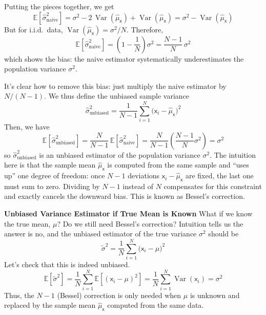Putting the pieces together, we get
\begin{equation}
    \mathbb{E}\!\left[\hat{\sigma}^{2}_{\text{naive}}\right] 
    = \sigma^2 - 2\,\operatorname{Var}(\hat{\mu}_{\mathsf{x}}) + \operatorname{Var}(\hat{\mu}_{\mathsf{x}})
    =\sigma^{2}-\operatorname{Var}(\hat{\mu}_{\mathsf{x}})
\end{equation}
But for i.i.d.\ data, $\operatorname{Var}(\hat{\mu}_{\mathsf{x}})=\sigma^{2}/N$. Therefore,
\begin{equation}
    \mathbb{E}\!\left[\hat{\sigma}^{2}_{\text{naive}}\right]
    =\left(1-\frac{1}{N}\right)\sigma^{2}
    =\frac{N-1}{N}\,\sigma^{2}
\end{equation}
which shows the bias: the naive estimator systematically underestimates the population variance $\sigma^2$.

It's clear how to remove this bias: just multiply the naive estimator by $N/(N-1)$. We thus define the unbiased sample variance
\begin{equation}
    \hat{\sigma}^{2}_{\text{unbiased}} = \frac{1}{N-1}\sum_{i=1}^{N}\bigl(\mathsf{x}_i-\hat{\mu}_{\mathsf{x}}\bigr)^{2}
\end{equation}
Then, we have
\begin{equation}
    \mathbb{E}[\hat{\sigma}^{2}_{\text{unbiased}}]
    =\frac{N}{N-1}\,\mathbb{E}\!\left[\hat{\sigma}^{2}_{\text{naive}}\right]
    =\frac{N}{N-1}\left(\frac{N-1}{N}\sigma^{2}\right)
    =\sigma^{2}
\end{equation}
so $\hat{\sigma}^{2}_{\text{unbiased}}$ is an unbiased estimator of the population variance $\sigma^{2}$. The intuition here is that the sample mean $\hat{\mu}_{\mathsf{x}}$ is computed from the same sample and ``uses up'' one degree of freedom: once $N-1$ deviations $\mathsf{x}_i-\hat{\mu}_{\mathsf{x}}$ are fixed, the last one must sum to zero. Dividing by $N-1$ instead of $N$ compensates for this constraint and exactly cancels the downward bias. This is known as Bessel's correction.

\begin{exampleBox}
    \textbf{Unbiased Variance Estimator if True Mean is Known}
    What if we know the true mean, $\mu$? Do we still need Bessel's correction? Intuition tells us the answer is no, and the unbiased estimator of the true variance $\sigma^2$ should be
    \begin{equation}
        \tilde{\sigma}^2 = \frac{1}{N}\sum_{i=1}^N \bigl(\mathsf{x}_i - \mu\bigr)^2
    \end{equation}
    Let's check that this is indeed unbiased.
    \begin{equation}
        \mathbb{E}\!\left[\tilde{\sigma}^2\right]
        = \frac{1}{N}\sum_{i=1}^N \mathbb{E}\!\left[(\mathsf{x}_i-\mu)^2\right]
        = \frac{1}{N}\sum_{i=1}^N \operatorname{Var}(\mathsf{x}_i)
        = \sigma^2
    \end{equation}
    Thus, the $N-1$ (Bessel) correction is only needed when $\mu$ is unknown and replaced by the sample mean $\hat{\mu}_{\mathsf{x}}$ computed from the same data.

\end{exampleBox}

